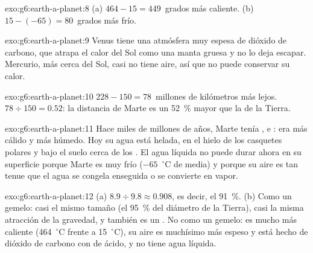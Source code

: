 \begin{solution}{exo:g6:earth-a-planet:8}
(a) $464 - 15 = 449$~grados más caliente. (b) $15 - (-65) = 80$~grados más frío.
\end{solution}

\begin{solution}{exo:g6:earth-a-planet:9}
Venus tiene una atmósfera muy espesa de dióxido de carbono, que atrapa el
calor del Sol como una manta gruesa y no lo deja escapar. Mercurio, más
cerca del Sol, casi no tiene aire, así que no puede conservar su calor.
\end{solution}

\begin{solution}{exo:g6:earth-a-planet:10}
$228 - 150 = 78$~millones de kilómetros más lejos. $78 \div 150 = 0.52$: la
distancia de Marte es un 52~\% mayor que la de la Tierra.
\end{solution}

\begin{solution}{exo:g6:earth-a-planet:11}
Hace miles de millones de años, Marte tenía ,  e : era
más cálido y más húmedo. Hoy su agua está helada, en el hielo de los
casquetes polares y bajo el suelo cerca de los . El agua líquida no
puede durar ahora en su superficie porque Marte es muy frío
($-65$~$^\circ$C de media) y porque su aire es tan tenue que el agua se
congela enseguida o se convierte en vapor.
\end{solution}

\begin{solution}{exo:g6:earth-a-planet:12}
(a) $8.9 \div 9.8 \approx 0.908$, es decir, el 91~\%. (b) Como un gemelo:
casi el mismo tamaño (el 95~\% del diámetro de la Tierra), casi la misma
atracción de la gravedad, y también es un . No como un
gemelo: es mucho más caliente (464~$^\circ$C frente a 15~$^\circ$C), su
aire es muchísimo más espeso y está hecho de dióxido de carbono con 
de ácido, y no tiene agua líquida.
\end{solution}

